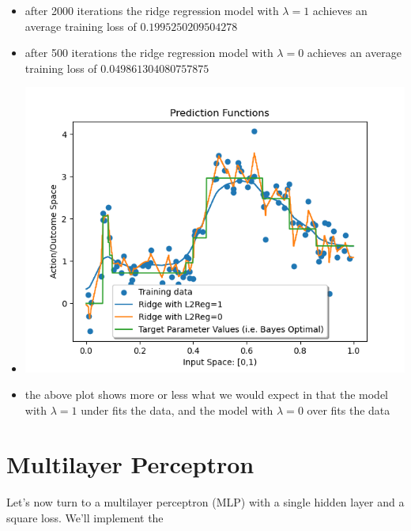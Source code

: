 \documentclass{article}
\theoremstyle{plain}
\theoremstyle{definition}
\begin{document}
\begin{enumerate}
\begin{itemize}
    \color{blue}
    \item after 2000 iterations the ridge regression model with $\lambda=1$ achieves an average training loss of $\mathbf{0.1995250209504278}$
    \item after 500 iterations the ridge regression model with $\lambda =0$ achieves an average training loss of $\mathbf{0.049861304080757875}$ 
    \item \includegraphics[width = 15cm]{homework_code/hw7/immages/hw_7_3.png}
    \item the above plot shows more or less what we would expect in that the model with $\lambda=1$ under fits the data, and the model with $\lambda =0$ over fits the data 
\end{itemize}
\setcounter{saveenum}{\value{enumi}}
\end{enumerate}



\section{Multilayer Perceptron}

Let's now turn to a multilayer perceptron (MLP)
with a single hidden layer and a square loss. We'll implement the
\end{document}

